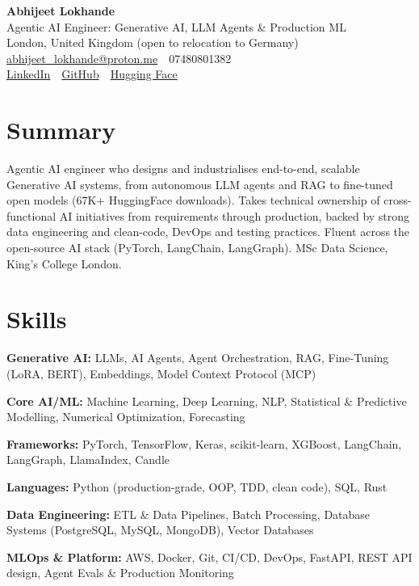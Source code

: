 \documentclass[10pt,a4paper]{article}
\newcommand{\sep}{\,\textcolor{accent!60}{\textbar}\,}
\begin{document}
\begin{center}
  {\fontsize{24}{26}\selectfont\bfseries Abhijeet Lokhande}\\[3pt]
  {\color{accent}\large Agentic AI Engineer: Generative AI, LLM Agents \& Production ML}\\[5pt]
  {\small
    London, United Kingdom (open to relocation to Germany) \sep
    \href{mailto:abhijeet_lokhande@proton.me}{abhijeet\_lokhande@proton.me} \sep
    07480801382 \\[2pt]
    \href{https://www.linkedin.com/in/ablds/}{LinkedIn} \sep
    \href{https://github.com/abhijeetscode}{GitHub} \sep
    \href{https://huggingface.co/ab-ai}{Hugging Face}
  }
\end{center}
\vspace{2pt}

\section{Summary}
Agentic AI engineer who designs and industrialises end-to-end, scalable Generative AI systems, from autonomous LLM agents and RAG to fine-tuned open models (67K+ HuggingFace downloads). Takes technical ownership of cross-functional AI initiatives from requirements through production, backed by strong data engineering and clean-code, DevOps and testing practices. Fluent across the open-source AI stack (PyTorch, LangChain, LangGraph). MSc Data Science, King's College London.

\section{Skills}
\begin{tight}
  \item[\textcolor{accent}{\small$\bullet$}] \textbf{Generative AI:} LLMs, AI Agents, Agent Orchestration, RAG, Fine-Tuning (LoRA, BERT), Embeddings, Model Context Protocol (MCP)
  \item[\textcolor{accent}{\small$\bullet$}] \textbf{Core AI/ML:} Machine Learning, Deep Learning, NLP, Statistical \& Predictive Modelling, Numerical Optimization, Forecasting
  \item[\textcolor{accent}{\small$\bullet$}] \textbf{Frameworks:} PyTorch, TensorFlow, Keras, scikit-learn, XGBoost, LangChain, LangGraph, LlamaIndex, Candle
  \item[\textcolor{accent}{\small$\bullet$}] \textbf{Languages:} Python (production-grade, OOP, TDD, clean code), SQL, Rust
  \item[\textcolor{accent}{\small$\bullet$}] \textbf{Data Engineering:} ETL \& Data Pipelines, Batch Processing, Database Systems (PostgreSQL, MySQL, MongoDB), Vector Databases
  \item[\textcolor{accent}{\small$\bullet$}] \textbf{MLOps \& Platform:} AWS, Docker, Git, CI/CD, DevOps, FastAPI, REST API design, Agent Evals \& Production Monitoring
\end{tight}
\end{document}
